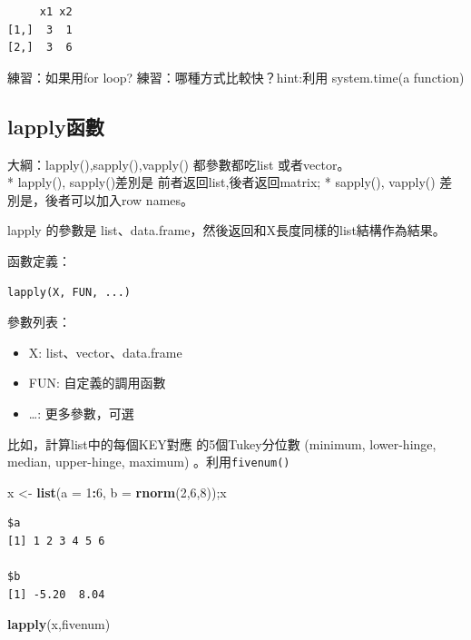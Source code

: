 \documentclass[]{book}
\newenvironment{Shaded}{\begin{snugshade}}{\end{snugshade}}
\newcommand{\DataTypeTok}[1]{\textcolor[rgb]{0.13,0.29,0.53}{#1}}
\newcommand{\DecValTok}[1]{\textcolor[rgb]{0.00,0.00,0.81}{#1}}
\newcommand{\KeywordTok}[1]{\textcolor[rgb]{0.13,0.29,0.53}{\textbf{#1}}}
\newcommand{\NormalTok}[1]{#1}
\newcommand{\OperatorTok}[1]{\textcolor[rgb]{0.81,0.36,0.00}{\textbf{#1}}}
\newcommand{\StringTok}[1]{\textcolor[rgb]{0.31,0.60,0.02}{#1}}
\providecommand{\tightlist}{%
  \setlength{\itemsep}{0pt}\setlength{\parskip}{0pt}}
\theoremstyle{definition}
\theoremstyle{definition}
\theoremstyle{definition}
\theoremstyle{remark}
\begin{document}
\begin{verbatim}
     x1 x2
[1,]  3  1
[2,]  3  6
\end{verbatim}

練習：如果用for loop? 練習：哪種方式比較快？hint:利用 system.time(a
function)

\hypertarget{lapply}{%
\subsection{lapply函數}\label{lapply}}

大綱：lapply(),sapply(),vapply() 都參數都吃list 或者vector。\\
* lapply(), sapply()差別是 前者返回list,後者返回matrix; * sapply(),
vapply() 差別是，後者可以加入row names。

lapply 的參數是
list、data.frame，然後返回和X長度同樣的list結構作為結果。

函數定義：

\begin{verbatim}
lapply(X, FUN, ...)
\end{verbatim}

參數列表：

\begin{itemize}
\tightlist
\item
  X: list、vector、data.frame
\item
  FUN: 自定義的調用函數
\item
  \ldots{}: 更多參數，可選
\end{itemize}

比如，計算list中的每個KEY對應 的5個Tukey分位數 (minimum, lower-hinge,
median, upper-hinge, maximum) 。利用\texttt{fivenum()}

\begin{Shaded}
\begin{Highlighting}[]
\NormalTok{x <-}\StringTok{ }\KeywordTok{list}\NormalTok{(}\DataTypeTok{a =} \DecValTok{1}\OperatorTok{:}\DecValTok{6}\NormalTok{, }\DataTypeTok{b =} \KeywordTok{rnorm}\NormalTok{(}\DecValTok{2}\NormalTok{,}\DecValTok{6}\NormalTok{,}\DecValTok{8}\NormalTok{));x}
\end{Highlighting}
\end{Shaded}

\begin{verbatim}
$a
[1] 1 2 3 4 5 6

$b
[1] -5.20  8.04
\end{verbatim}

\begin{Shaded}
\begin{Highlighting}[]
\KeywordTok{lapply}\NormalTok{(x,fivenum)}
\end{Highlighting}
\end{Shaded}
\end{document}
